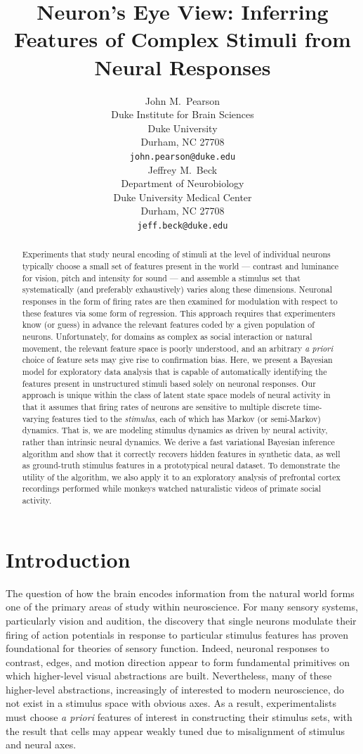 \documentclass{article} %
\title{Neuron's Eye View: Inferring Features of Complex Stimuli from Neural Responses}
\author{
John M.~Pearson\\
Duke Institute for Brain Sciences \\
Duke University\\
Durham, NC 27708 \\
\texttt{john.pearson@duke.edu} \\
\And
Jeffrey M.~Beck \\
Department of Neurobiology \\
Duke University Medical Center \\
Durham, NC 27708 \\
\texttt{jeff.beck@duke.edu} \\
}
\begin{document}
\maketitle

\begin{abstract}
Experiments that study neural encoding of stimuli at the level of individual neurons typically choose a small set of features present in the world --- contrast and luminance for vision, pitch and intensity for sound --- and assemble a stimulus set that systematically (and preferably exhaustively) varies along these dimensions. Neuronal responses in the form of firing rates are then examined for modulation with respect to these features via some form of regression. This approach requires that experimenters know (or guess) in advance the relevant features coded by a given population of neurons. Unfortunately, for domains as complex as social interaction or natural movement, the relevant feature space is poorly understood, and an arbitrary \emph{a priori} choice of feature sets may give rise to confirmation bias. Here, we present a Bayesian model for exploratory data analysis that is capable of automatically identifying the features present in unstructured stimuli based solely on neuronal responses. Our approach is unique within the class of latent state space models of neural activity in that it assumes that firing rates of neurons are sensitive to multiple discrete time-varying features tied to the \emph{stimulus}, each of which has Markov (or semi-Markov) dynamics. That is, we are modeling stimulus dynamics as driven by neural activity, rather than intrinsic neural dynamics.  We derive a fast variational Bayesian inference algorithm and show that it correctly recovers hidden features in synthetic data, as well as ground-truth stimulus features in a prototypical neural dataset. To demonstrate the utility of the algorithm, we also apply it to an exploratory analysis of prefrontal cortex recordings performed while monkeys watched naturalistic videos of primate social activity.
\end{abstract}

\section{Introduction}
The question of how the brain encodes information from the natural world forms one of the primary areas of study within neuroscience. For many sensory systems, particularly vision and audition, the discovery that single neurons modulate their firing of action potentials in response to particular stimulus features has proven foundational for theories of sensory function. Indeed, neuronal responses to contrast, edges, and motion direction appear to form fundamental primitives on which higher-level visual abstractions are built. Nevertheless, many of these higher-level abstractions, increasingly of interested to modern neuroscience, do not exist in a stimulus space with obvious axes. As a result, experimentalists must choose \emph{a priori} features of interest in constructing their stimulus sets, with the result that cells may appear weakly tuned due to misalignment of stimulus and neural axes.
\end{document}
